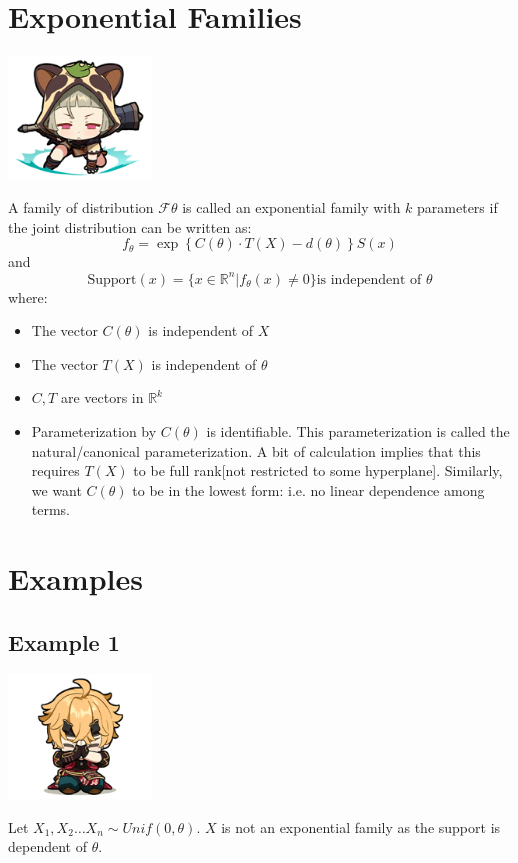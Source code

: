\documentclass[oneside]{book}
\begin{document}
\section{Exponential Families}
\begin{marginfigure}%
    \includegraphics[width=1.5in]{chibis/file_027.png}
\end{marginfigure}%
A family of distribution $\mathcal F\theta$ is called an exponential family with $k$ parameters if the joint distribution can be written as:
$$f_\theta=\exp \left\{C(\theta)\cdot T(X)-d(\theta)\right\}S(x)$$
and 
$$\text{Support}(x)=\{x\in\mathbb R^n|f_\theta(x)\ne0\}\text{is independent of }\theta$$
where:
\begin{itemize}
    \item The vector $C(\theta)$ is independent of $X$
    \item The vector $T(X)$ is independent of $\theta$
    \item $C,T$ are vectors in $\mathbb R^k$
    \item Parameterization by $C(\theta)$ is identifiable. This parameterization is called the natural/canonical parameterization. A bit of calculation implies that this requires $T(X)$ to be full rank[not restricted to some hyperplane]. Similarly, we want $C(\theta)$ to be in the lowest form: i.e. no linear dependence among terms.
\end{itemize}
\section{Examples}
\subsection{Example 1}
\begin{marginfigure}%
    \includegraphics[width=1.5in]{chibis/file_029.png}
\end{marginfigure}%
Let $X_1,X_2\hdots X_n\sim Unif(0,\theta)$. $X$ is not an exponential family as the support is dependent of $\theta$.
\end{document}
